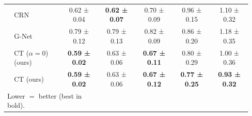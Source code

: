 \begin{tabular}{ll|ccccc}
           & CRN &           0.62 ± 0.04 &  \textbf{0.62 ± 0.07} &           0.70 ± 0.09 &           0.96 ± 0.15 &           1.10 ± 0.32 \\
\vspace{0.9mm}
           & G-Net &           0.79 ± 0.12 &           0.79 ± 0.13 &           0.82 ± 0.09 &           0.86 ± 0.20 &           1.18 ± 0.35 \\
           & CT ($\alpha = 0$) (ours) &  \textbf{0.59 ± 0.02} &           0.63 ± 0.06 &  \textbf{0.67 ± 0.11} &           0.80 ± 0.29 &           1.00 ± 0.36 \\
           & CT (ours) &  \textbf{0.59 ± 0.02} &           0.63 ± 0.06 &  \textbf{0.67 ± 0.12} &  \textbf{0.77 ± 0.25} &  \textbf{0.93 ± 0.32} \\
\bottomrule
\multicolumn{3}{l}{Lower $=$ better (best in bold). }
\end{tabular}
